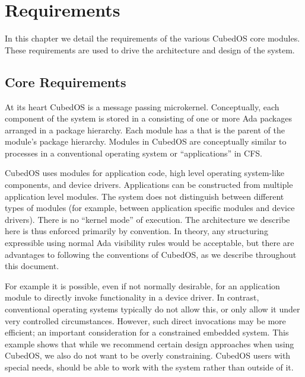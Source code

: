 
\chapter{Requirements}
\label{chapt:requirements}

In this chapter we detail the requirements of the various CubedOS core modules. These
requirements are used to drive the architecture and design of the system. 

\section{Core Requirements}
\label{sec:core-requirements}

At its heart CubedOS is a message passing microkernel. Conceptually, each component of the
system is stored in a  consisting of one or more Ada packages arranged in a
package hierarchy. Each module has a  that is the parent of the
module's package hierarchy. Modules in CubedOS are conceptually similar to processes in a
conventional operating system or ``applications'' in CFS.

CubedOS uses modules for application code, high level operating system-like components, and
device drivers. Applications can be constructed from multiple application level modules. The
system does not distinguish between different types of modules (for example, between application
specific modules and device drivers). There is no ``kernel mode'' of execution. The architecture
we describe here is thus enforced primarily by convention. In theory, any structuring
expressible using normal Ada visibility rules would be acceptable, but there are advantages to
following the conventions of CubedOS, as we describe throughout this document. 

For example it is possible, even if not normally desirable, for an application module to
directly invoke functionality in a device driver. In contrast, conventional operating systems
typically do not allow this, or only allow it under very controlled circumstances. However, such
direct invocations may be more efficient; an important consideration for a constrained embedded
system. This example shows that while we recommend certain design approaches when using CubedOS,
we also do not want to be overly constraining. CubedOS users with special needs, should be able
to work with the system rather than outside of it.

